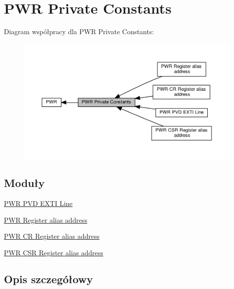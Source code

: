 \hypertarget{group___p_w_r___private___constants}{}\section{P\+WR Private Constants}
\label{group___p_w_r___private___constants}
Diagram współpracy dla P\+WR Private Constants\+:\nopagebreak
\begin{figure}[H]
\begin{center}
\leavevmode
\includegraphics[width=350pt]{group___p_w_r___private___constants}
\end{center}
\end{figure}
\subsection*{Moduły}
\begin{DoxyCompactItemize}
\item 
\hyperlink{group___p_w_r___p_v_d___e_x_t_i___line}{P\+W\+R P\+V\+D E\+X\+T\+I Line}
\item 
\hyperlink{group___p_w_r__register__alias__address}{P\+W\+R Register alias address}
\item 
\hyperlink{group___p_w_r___c_r__register__alias}{P\+W\+R C\+R Register alias address}
\item 
\hyperlink{group___p_w_r___c_s_r__register__alias}{P\+W\+R C\+S\+R Register alias address}
\end{DoxyCompactItemize}


\subsection{Opis szczegółowy}
